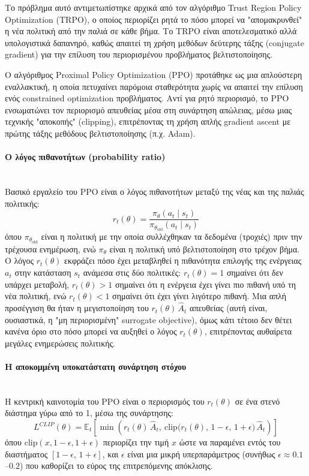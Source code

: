 \documentclass[12pt]{article}
\begin{document}
Το πρόβλημα αυτό αντιμετωπίστηκε αρχικά από τον αλγόριθμο Trust Region Policy Optimization (TRPO), ο οποίος περιορίζει ρητά το πόσο μπορεί να "απομακρυνθεί" η νέα πολιτική από την παλιά σε κάθε βήμα. Το TRPO είναι αποτελεσματικό αλλά υπολογιστικά δαπανηρό, καθώς απαιτεί τη χρήση μεθόδων δεύτερης τάξης (conjugate gradient) για την επίλυση του περιορισμένου προβλήματος βελτιστοποίησης.

Ο αλγόριθμος Proximal Policy Optimization (PPO) \cite{schulman2017proximal} προτάθηκε ως μια απλούστερη εναλλακτική, η οποία πετυχαίνει παρόμοια σταθερότητα χωρίς να απαιτεί την επίλυση ενός constrained optimization προβλήματος. Αντί για ρητό περιορισμό, το PPO ενσωματώνει τον περιορισμό απευθείας μέσα στη συνάρτηση απώλειας, μέσω μιας τεχνικής "αποκοπής" (clipping), επιτρέποντας τη χρήση απλής gradient ascent με πρώτης τάξης μεθόδους βελτιστοποίησης (π.χ. Adam).

\paragraph{Ο λόγος πιθανοτήτων (probability ratio)}~\\
Βασικό εργαλείο του PPO είναι ο λόγος πιθανοτήτων μεταξύ της νέας και της παλιάς πολιτικής:
\[
r_t(\theta) = \frac{\pi_\theta(a_t \mid s_t)}{\pi_{\theta_{\text{old}}}(a_t \mid s_t)}
\]
όπου $\pi_{\theta_{\text{old}}}$ είναι η πολιτική με την οποία συλλέχθηκαν τα δεδομένα (τροχιές) πριν την τρέχουσα ενημέρωση, ενώ $\pi_\theta$ είναι η πολιτική υπό βελτιστοποίηση στο τρέχον βήμα. Ο λόγος $r_t(\theta)$ εκφράζει πόσο έχει μεταβληθεί η πιθανότητα επιλογής της ενέργειας $a_t$ στην κατάσταση $s_t$ ανάμεσα στις δύο πολιτικές: $r_t(\theta) = 1$ σημαίνει ότι δεν υπάρχει μεταβολή, $r_t(\theta) > 1$ σημαίνει ότι η ενέργεια έχει γίνει πιο πιθανή υπό τη νέα πολιτική, ενώ $r_t(\theta) < 1$ σημαίνει ότι έχει γίνει λιγότερο πιθανή. Μια απλή προσέγγιση θα ήταν η μεγιστοποίηση του $r_t(\theta)\,\hat{A}_t$ απευθείας (αυτή είναι, ουσιαστικά, η "μη περιορισμένη" surrogate objective), όμως κάτι τέτοιο δεν θέτει κανένα όριο στο πόσο μπορεί να αυξηθεί ο λόγος $r_t(\theta)$, επιτρέποντας αυθαίρετα μεγάλες ενημερώσεις πολιτικής.

\paragraph{Η αποκομμένη υποκατάστατη συνάρτηση στόχου}~\\
Η κεντρική καινοτομία του PPO είναι ο περιορισμός του $r_t(\theta)$ σε ένα στενό διάστημα γύρω από το 1, μέσω της συνάρτησης:
\[
L^{CLIP}(\theta) = \mathbb{E}_t \left[ \min\left( r_t(\theta)\, \hat{A}_t,\ \text{clip}\big(r_t(\theta),\, 1-\epsilon,\, 1+\epsilon\big)\, \hat{A}_t \right) \right]
\]
όπου $\text{clip}(x, 1-\epsilon, 1+\epsilon)$ περιορίζει την τιμή $x$ ώστε να παραμένει εντός του διαστήματος $[1-\epsilon,\, 1+\epsilon]$, και $\epsilon$ είναι μια μικρή υπερπαράμετρος (συνήθως $\epsilon \approx 0.1$–$0.2$) που καθορίζει το εύρος της επιτρεπόμενης απόκλισης.
\end{document}
